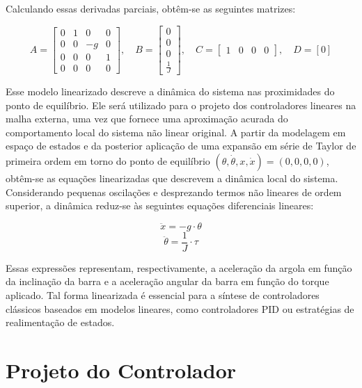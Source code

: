 \documentclass[a4paper, 12pt]{article} %
\begin{document}
Calculando essas derivadas parciais, obtêm-se as seguintes matrizes:

\[
A = \begin{bmatrix}
0 & 1 & 0 & 0 \\
0 & 0 & -g & 0 \\
0 & 0 & 0 & 1 \\
0 & 0 & 0 & 0
\end{bmatrix}, \quad
B = \begin{bmatrix}
0 \\
0 \\
0 \\
\frac{1}{J}
\end{bmatrix}, \quad
C = \begin{bmatrix}
1 & 0 & 0 & 0
\end{bmatrix}, \quad
D = [0]
\]

Esse modelo linearizado descreve a dinâmica do sistema nas proximidades do ponto de equilíbrio. Ele será utilizado para o projeto dos controladores lineares na malha externa, uma vez que fornece uma aproximação acurada do comportamento local do sistema não linear original. A partir da modelagem em espaço de estados e da posterior aplicação de uma expansão em série de Taylor de primeira ordem em torno do ponto de equilíbrio \((\theta, \dot{\theta}, x, \dot{x}) = (0, 0, 0, 0)\), obtêm-se as equações linearizadas que descrevem a dinâmica local do sistema. Considerando pequenas oscilações e desprezando termos não lineares de ordem superior, a dinâmica reduz-se às seguintes equações diferenciais lineares:

\begin{equation}
    \ddot{x} = -g \cdot \theta
\end{equation}
\begin{equation}
    \ddot{\theta} = \frac{1}{J} \cdot \tau
\end{equation}

Essas expressões representam, respectivamente, a aceleração da argola em função da inclinação da barra e a aceleração angular da barra em função do torque aplicado. Tal forma linearizada é essencial para a síntese de controladores clássicos baseados em modelos lineares, como controladores PID ou estratégias de realimentação de estados.



\section{Projeto do Controlador}
\end{document}
